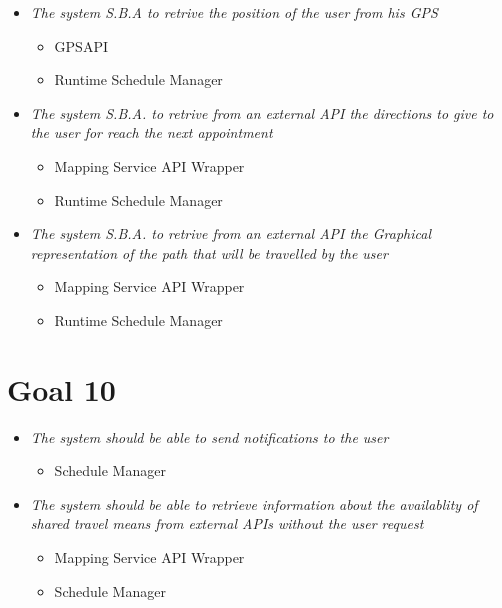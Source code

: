 \begin{itemize}

\item \textit{The system S.B.A to retrive the position of the user from his GPS}

\begin{itemize}
\item GPSAPI
\item Runtime Schedule Manager
\end{itemize}

\item \textit{ The system S.B.A. to retrive from an external API the directions to give to the user for reach the next appointment}

\begin{itemize}
\item Mapping Service API Wrapper
\item Runtime Schedule Manager
\end{itemize}

\item \textit{The system S.B.A. to retrive from an external API the Graphical representation of the path that will be travelled by the user}

\begin{itemize}
\item Mapping Service API Wrapper
\item Runtime Schedule Manager
\end{itemize}

\end{itemize}

\section{Goal 10}

\begin{itemize}

\item \textit{The system should be able to send notifications to the user}
\begin{itemize}
\item Schedule Manager
\end{itemize}

\item \textit{The system should be able to retrieve information about the availablity of shared travel means from external APIs without the user request}
\begin{itemize}
\item Mapping Service API Wrapper
\item Schedule Manager
\end{itemize}

\end{itemize}


